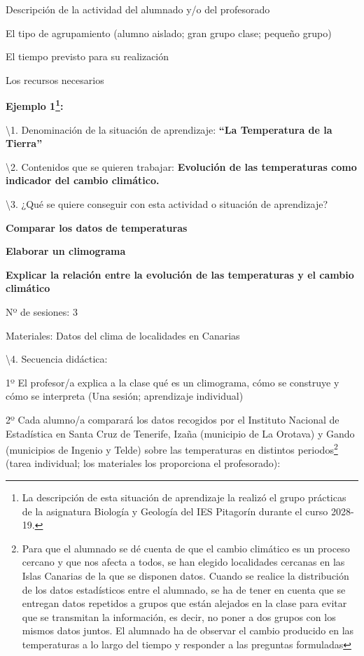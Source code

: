 \documentclass[
]{article}
\begin{document}
Descripción de la actividad del alumnado y/o del profesorado

El tipo de agrupamiento (alumno aislado; gran grupo clase; pequeño
grupo)

El tiempo previsto para su realización

Los recursos necesarios

\textbf{Ejemplo 1\footnote{La descripción de esta situación de
  aprendizaje la realizó el grupo prácticas de la asignatura Biología y
  Geología del IES Pitagorín durante el curso 2028-19.}:}

\textbackslash1. Denominación de la situación de aprendizaje:
\textbf{``La Temperatura de la Tierra''}

\textbackslash2. Contenidos que se quieren trabajar: \textbf{Evolución
de las temperaturas como indicador del cambio climático.}

\textbackslash3. ¿Qué se quiere conseguir con esta actividad o situación
de aprendizaje?

\textbf{Comparar los datos de temperaturas}

\textbf{Elaborar un climograma}

\textbf{Explicar la relación entre la evolución de las temperaturas y el
cambio climático}

Nº de sesiones: 3

Materiales: Datos del clima de localidades en Canarias

\textbackslash4. Secuencia didáctica:

1º El profesor/a explica a la clase qué es un climograma, cómo se
construye y cómo se interpreta (Una sesión; aprendizaje individual)

2º Cada alumno/a comparará los datos recogidos por el Instituto Nacional
de Estadística en Santa Cruz de Tenerife, Izaña (municipio de La
Orotava) y Gando (municipios de Ingenio y Telde) sobre las temperaturas
en distintos periodos\footnote{Para que el alumnado se dé cuenta de que
  el cambio climático es un proceso cercano y que nos afecta a todos, se
  han elegido localidades cercanas en las Islas Canarias de la que se
  disponen datos. Cuando se realice la distribución de los datos
  estadísticos entre el alumnado, se ha de tener en cuenta que se
  entregan datos repetidos a grupos que están alejados en la clase para
  evitar que se transmitan la información, es decir, no poner a dos
  grupos con los mismos datos juntos. El alumnado ha de observar el
  cambio producido en las temperaturas a lo largo del tiempo y responder
  a las preguntas formuladas} (tarea individual; los materiales los
proporciona el profesorado):
\end{document}
